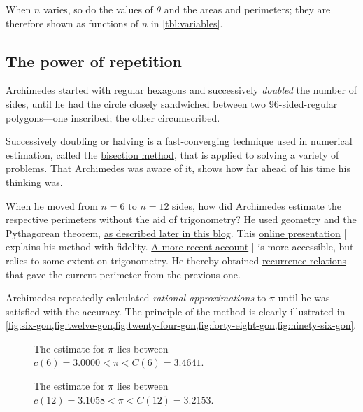 \documentclass[
  a4paper,
]{article}
\begin{document}
When \(n\) varies, so do the values of \(\theta\) and the areas and
perimeters; they are therefore shown as functions of \(n\) in
\cref{tbl:variables}.

\subsection{The power of repetition}\label{the-power-of-repetition}

Archimedes started with regular hexagons and successively \emph{doubled}
the number of sides, until he had the circle closely sandwiched between
two 96-sided-regular polygons---one inscribed; the other circumscribed.

Successively doubling or halving is a fast-converging technique used in
numerical estimation, called the
\href{https://en.wikipedia.org/wiki/Bisection_method}{bisection method},
that is applied to solving a variety of problems. That Archimedes was
aware of it, shows how far ahead of his time his thinking was.

When he moved from \(n=6\) to \(n = 12\) sides, how did Archimedes
estimate the respective perimeters without the aid of trigonometry? He
used geometry and the Pythagorean theorem,
\hyperref[the-angle-bisector-theorem]{as described later in this blog}.
This \href{https://nonagon.org/ExLibris/archimedes-pi}{online
presentation} {[}\citeproc{ref-bertrand2014}{2}{]} explains his method
with fidelity.
\href{https://publications.azimpremjiuniversity.edu.in/3356/1/02-DaminiAndAbhishek_PiIs22By7_Final.pdf}{A
more recent account} {[}\citeproc{ref-damini-dhar-2020}{3}{]} is more
accessible, but relies to some extent on trigonometry. He thereby
obtained
\href{https://en.wikipedia.org/wiki/Recurrence_relation}{recurrence
relations} that gave the current perimeter from the previous one.

Archimedes repeatedly calculated \emph{rational approximations} to
\(\pi\) until he was satisfied with the accuracy. The principle of the
method is clearly illustrated in
\cref{fig:six-gon,fig:twelve-gon,fig:twenty-four-gon,fig:forty-eight-gon,fig:ninety-six-gon}.

\begin{figure}
\centering

\caption{The estimate for \(\pi\) lies between
\(c(6) = 3.0000 < \pi < C(6) = 3.4641\).}\label{fig:six-gon}
\end{figure}

\begin{figure}
\centering

\caption{The estimate for \(\pi\) lies between
\(c(12) = 3.1058 < \pi < C(12) = 3.2153\).}\label{fig:twelve-gon}
\end{figure}
\end{document}
